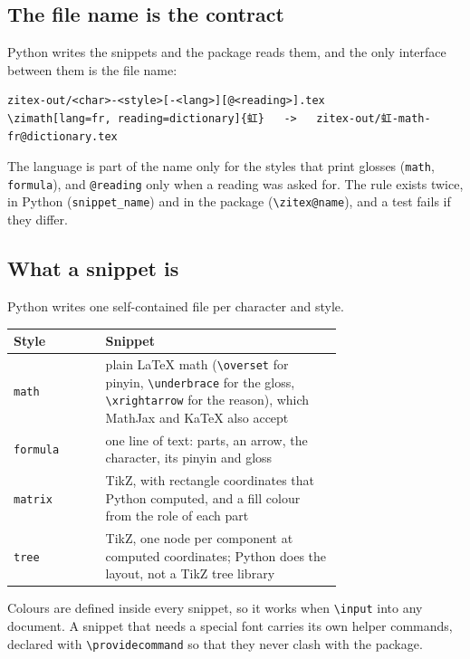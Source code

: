 \documentclass[11pt]{article}
\newcommand{\cmd}[1]{\texttt{\textbackslash #1}}               %
\newenvironment{syntax}{\par\smallskip\begin{minipage}{\linewidth}\footnotesize\setlength{\parindent}{0pt}\noindent\ignorespaces}
  {\end{minipage}\par\smallskip}
\begin{document}
\subsection{The file name is the contract}
Python writes the snippets and the package reads them, and the only interface between them is the file name:

\begin{syntax}
\begin{verbatim}
zitex-out/<char>-<style>[-<lang>][@<reading>].tex
\zimath[lang=fr, reading=dictionary]{虹}   ->   zitex-out/虹-math-fr@dictionary.tex
\end{verbatim}
\end{syntax}

The language is part of the name only for the styles that print glosses (\texttt{math}, \texttt{formula}), and \texttt{@reading} only when a reading was asked for. The rule exists twice, in Python (\texttt{snippet\_name}) and in the package (\cmd{zitex@name}), and a test fails if they differ.

\subsection{What a snippet is}
Python writes one self-contained file per character and style.

\begin{center}
\small
\begin{tabular}{@{}lp{0.72\linewidth}@{}}
\toprule
Style & Snippet \\
\midrule
\texttt{math}    & plain \LaTeX{} math (\cmd{overset} for pinyin, \cmd{underbrace} for the gloss, \cmd{xrightarrow} for the reason), which MathJax and KaTeX also accept \\
\texttt{formula} & one line of text: parts, an arrow, the character, its pinyin and gloss \\
\texttt{matrix}  & TikZ, with rectangle coordinates that Python computed, and a fill colour from the role of each part \\
\texttt{tree}    & TikZ, one node per component at computed coordinates; Python does the layout, not a TikZ tree library \\
\bottomrule
\end{tabular}
\end{center}
Colours are defined inside every snippet, so it works when \cmd{input} into any document. A snippet that needs a special font carries its own helper commands, declared with \cmd{providecommand} so that they never clash with the package.
\end{document}
